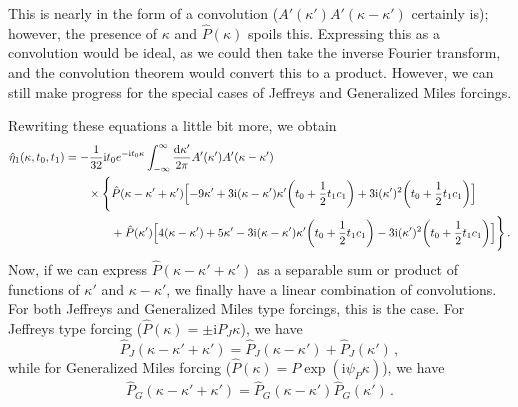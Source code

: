 \documentclass{jfm}
\newcommand{\GenPk}{\hat{P}(\kappa)}
\newcommand{\im}{\mathrm{i}}
\begin{document}
This is nearly in the form of a convolution ($A'(\kappa')
A'(\kappa-\kappa')$ certainly is); however, the presence of $\kappa$ and
$\hat{P}(\kappa)$ spoils this.
Expressing this as a convolution would be ideal, as we could then take
the inverse Fourier transform, and the convolution theorem would convert
this to a product.
However, we can still make progress for the special cases of Jeffreys
and Generalized Miles forcings.

Rewriting these equations a little bit more, we obtain
\begin{equation}
  \begin{aligned}
  \hat{\eta}_1(\kappa,t_0,t_1) &=
  -\frac{1}{32} \im t_0 e^{-\im t_0 \kappa}
  \int_{-\infty}^{\infty} \frac{\dd{\kappa'}}{2\pi} A'(\kappa') A'(\kappa-\kappa')
  \\ &\qquad
  \times \Biggl\{
    \hat{P}(\kappa-\kappa' + \kappa')
    \Bigl[-9 \kappa' + 3 \im (\kappa - \kappa') \kappa' \pqty{t_0 +
      \frac{1}{2} t_1 c_1}
    + 3 \im (\kappa')^2 \pqty{t_0 + \frac{1}{2} t_1 c_1} \Bigr] \\
  &\qquad\qquad
    + \hat{P}(\kappa')
    \Bigl[4 (\kappa-\kappa') + 5\kappa'
    -3 \im (\kappa - \kappa') \kappa' \pqty{t_0 + \frac{1}{2} t_1 c_1}
  -3 \im (\kappa')^2 \pqty{t_0 + \frac{1}{2} t_1 c_1}\Bigr]
  \Biggr\}
  \,.
  \end{aligned}
  \label{eq:general_pressure_expr}
\end{equation}
Now, if we can express $\hat{P}(\kappa-\kappa' +\kappa')$ as a separable
sum or product of functions of $\kappa'$ and $\kappa-\kappa'$, we
finally have a linear combination of convolutions.
For both Jeffreys and Generalized Miles type forcings, this is the case.
For Jeffreys type forcing ($\GenPk = \pm \im P_J \kappa$), we have
\[
  \hat{P}_J(\kappa - \kappa' + \kappa') = \hat{P}_J(\kappa-\kappa')
  + \hat{P}_J(\kappa') \,,
\]
while for Generalized Miles forcing ($\GenPk = P \exp(\im \psi_P
\kappa)$), we have
\[
  \hat{P}_G(\kappa-\kappa'+\kappa') = \hat{P}_G(\kappa-\kappa')
  \hat{P}_G(\kappa') \,.
\]
\end{document}

